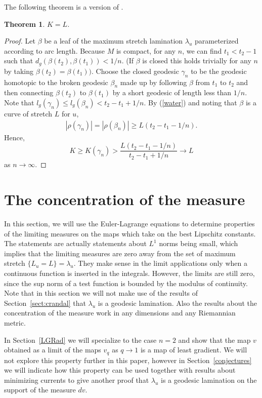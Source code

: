 \documentclass{ip-journal}
\newtheorem{theorem}{Theorem}[section]
\theoremstyle{definition}
\numberwithin{equation}{section}
\begin{document}
The following theorem is a version of \cite[Theorem 8.5]{thurston}. 
  \begin{theorem}\label{K=L} $K=L$.
\end{theorem}
\begin{proof}  
Let $\beta$ be a leaf of the maximum stretch lamination $\lambda_u$  parameterized according to arc length. Because $M$ is compact, for any $n$, we can find $t_1 < t_2 - 1$ such that 
$d_g(\beta(t_2), \beta(t_1))< 1/n$. (If $\beta$ is closed this holds trivially for any $n$ by taking $\beta(t_2)=\beta(t_1))$. Choose the closed geodesic $\gamma_n$ to be the geodesic homotopic to the broken  geodesic $\beta_n$ made up by following $\beta$ from $t_1$ to $t_2$ and then connecting $\beta(t_2)$ to $\beta(t_1)$ by a short geodesic of length less than $1/n$.
Note that
 $l_g(\gamma_n) \leq l_g(\beta_n) < t_2 - t_1 + 1/n$.
By (\ref{water}) and noting that $\beta$ is a curve of stretch $L$ for $u$, 
\begin{eqnarray}\label{water2}
|\rho(\gamma_n)|=|\rho(\beta_n)| \geq L(t_2 - t_1 - 1/n).
\end{eqnarray}
Hence,
\[
K \geq K(\gamma_n) > \frac{L(t_2 - t_1 - 1/n)}{t_2 - t_1 + 1/n} \rightarrow L
\]
as $n \rightarrow \infty$.
\end{proof}

\section{The concentration of the measure}\label{consmeasure}
In this section, we will use the Euler-Lagrange equations to determine properties of the limiting measures on the maps which take on the best Lipschitz constants. 
The statements are actually statements about $L^1$ norms being small, which implies that the limiting measures are zero away from the set of maximum stretch $\{ L_u=L \}=\lambda_u$.  They make sense in the limit applications only when a continuous function is inserted in the integrals. However, the limits are still zero, since the sup norm of a test function is bounded by the modulus of continuity. Note that in this section we will not make use of the results of Section~\ref{sect:crandal} that $\lambda_u$ is a geodesic lamination. Also the results about the concentration of the measure work in any dimensions and any Riemannian metric.

In Section~\ref{LGRad} we will specialize to the case $n=2$ and show that the map $v$ obtained as a limit of the maps $v_q$ as $q \rightarrow 1$ is a map of least gradient. We will not explore this property further in this paper, however in Section~\ref{conjectures} we will indicate how this property can be used together with results about minimizing currents to give another proof that $\lambda_u$ is a geodesic lamination on the support of the measure $dv$. 
\end{document}
